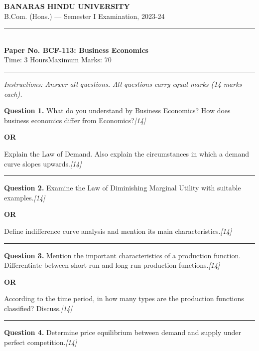 \documentclass[11pt,a4paper]{article}
\newcommand{\pts}[1]{\hfill   \textit{[#1]}}
\begin{document}
\begin{center}
  {\large\bfseries BANARAS HINDU UNIVERSITY}\\[2pt]
  {\normalsize B.Com. (Hons.) --- Semester I Examination, 2023-24}\\[6pt]
  \rule{0.8\linewidth}{0.5pt}\\[6pt]
  {\large\bfseries Paper No. BCF-113: Business Economics}\\[4pt]
  {\normalsize Time: 3 Hours\hfill Maximum Marks: 70}
\end{center}

\rule{\linewidth}{0.4pt}

\smallskip



\noindent   \textit{Instructions: Answer all questions. All questions carry equal marks (14 marks each).}

\bigskip




\noindent   \textbf{Question 1.}
What do you understand by Business Economics? How does business economics differ from Economics?\pts{14}

\centerline{   \textbf{OR}}

Explain the Law of Demand. Also explain the circumstances in which a demand curve slopes upwards.\pts{14}

\medskip\rule{\linewidth}{0.2pt}




\noindent   \textbf{Question 2.}
Examine the Law of Diminishing Marginal Utility with suitable examples.\pts{14}

\centerline{   \textbf{OR}}

Define indifference curve analysis and mention its main characteristics.\pts{14}

\medskip\rule{\linewidth}{0.2pt}




\noindent   \textbf{Question 3.}
Mention the important characteristics of a production function. Differentiate between short-run and long-run production functions.\pts{14}

\centerline{   \textbf{OR}}

According to the time period, in how many types are the production functions classified? Discuss.\pts{14}

\medskip\rule{\linewidth}{0.2pt}




\noindent   \textbf{Question 4.}
Determine price equilibrium between demand and supply under perfect competition.\pts{14}
\end{document}
